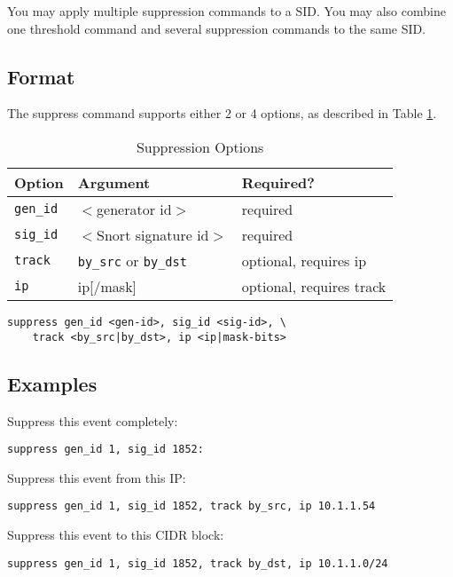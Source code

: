 \documentclass[english]{report}
\begin{document}
You may apply multiple suppression commands to a SID.  You may also combine one
threshold command and several suppression commands to the same SID.  

\subsection{Format}

The suppress command supports either 2 or 4 options, as described in Table \ref{suppression_options}. 

\begin{table}[!hbpt]
\caption{Suppression Options\label{suppression_options}}
\begin{center}\begin{tabular}{| l | p{3.5in} | l |}
\hline
\textbf{Option} & \textbf{Argument} & \textbf{Required?}\\
\hline
\hline
\texttt{gen\_id} & $<$generator id$>$ & required\\
\hline
\texttt{sig\_id} & $<$Snort signature id$>$  & required\\
\hline
\texttt{track} & \texttt{by\_src} or \texttt{by\_dst}  & optional, requires ip\\
\hline
\texttt{ip} & ip[/mask] & optional, requires track \\
\hline
\end{tabular}\end{center}
\end{table}

\begin{verbatim}
suppress gen_id <gen-id>, sig_id <sig-id>, \
    track <by_src|by_dst>, ip <ip|mask-bits>
\end{verbatim}

\subsection{Examples}
Suppress this event completely:
\begin{verbatim}
suppress gen_id 1, sig_id 1852:
\end{verbatim}

Suppress this event from this IP:
\begin{verbatim}
suppress gen_id 1, sig_id 1852, track by_src, ip 10.1.1.54
\end{verbatim}

Suppress this event to this CIDR block:
\begin{verbatim}
suppress gen_id 1, sig_id 1852, track by_dst, ip 10.1.1.0/24
\end{verbatim}
\end{document}
